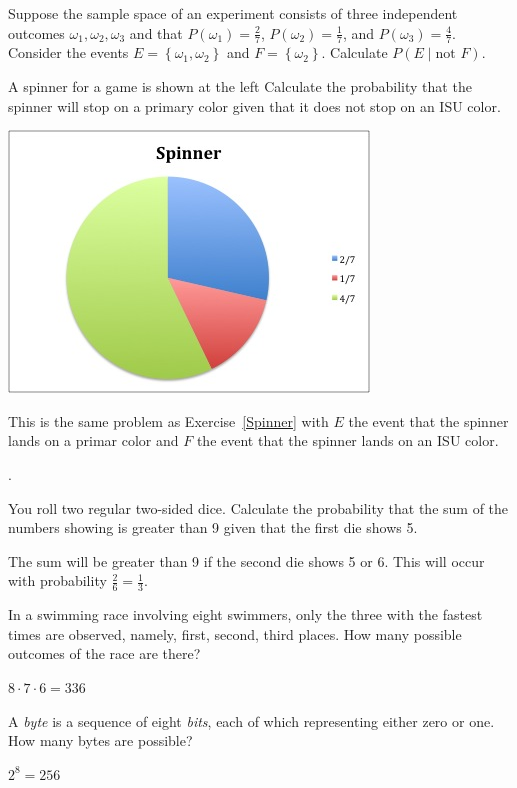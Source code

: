 \documentclass[answers,12pt]{exam}
\begin{document}
\begin{questions}
\question\label{Spinner} Suppose the sample space of an experiment
consists of three independent
outcomes $\omega_1,\omega_2,\omega_3$ and that
$P\left(\omega_1\right)=\frac{2}{7}$, $P\left(\omega_2\right)=\frac{1}{7}$,
and $P\left(\omega_3\right)=\frac{4}{7}$. Consider the events
$E=\left\{\omega_1,\omega_2\right\}$ and $F=\left\{\omega_2\right\}$.
Calculate $P\left(E\mid\text{not $F$}\right)$.
\begin{multicols}{2}
\question A spinner for a game is shown at the left
Calculate the probability that the spinner will stop
on a primary color given that it does not stop on an ISU color.
\begin{center}\includegraphics[scale=.6]{ReviewSpinner}\end{center}
\end{multicols}
\begin{solution} This is the same problem as Exercise~\ref{Spinner}
with $E$ the event that the spinner lands on a primar
color and $F$ the event that the spinner lands on an ISU color.
\end{solution}.

\question You roll two regular two-sided dice. Calculate the probability
that the sum of the numbers showing is greater than 9 given that
the first die shows 5.
\begin{solution} The sum will be greater than 9 if the second die
shows 5 or 6. This will occur with probability $\frac{2}{6}=\frac{1}{3}$.
\end{solution}

\question In a swimming race involving eight swimmers, only the three
with the fastest times are observed, namely, first, second, third places.
How many possible outcomes of the race are there?
\begin{solution} $8\cdot 7\cdot 6=336$ \end{solution}
\question A {\em byte} is a sequence of eight {\em bits}, each
of which representing either zero or one. How many bytes are possible?
\begin{solution} $2^8=256$\end{solution}


\end{questions}
\end{document}
